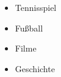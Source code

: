 \vspace{1em}
\begin{itemize}
    \item Tennisspiel
    \item Fußball
    \item Filme
    \item Geschichte
\end{itemize}